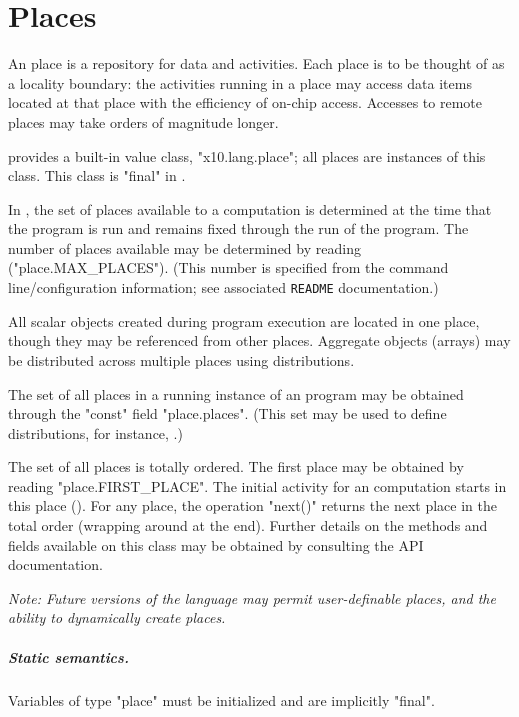 \chapter{Places}\label{XtenPlaces}

An \Xten{} place is a repository for data and activities. Each place
is to be thought of as a locality boundary: the activities running in
a place may access data items located at that place with the
efficiency of on-chip access. Accesses to remote places may take
orders of magnitude longer.

{}\Xten{} provides a built-in value class, \xcd"x10.lang.place"; all
places are instances of this class.  This class is \xcd"final" in
{}\XtenCurrVer.

In \XtenCurrVer{}, the set of places available to a computation is
determined at the time that the program is run and remains fixed
through the run of the program. The number of places available 
may be determined by reading (\xcd"place.MAX_PLACES"). (This number
is specified from the command line/configuration information; 
see associated {\tt README} documentation.)

All scalar objects created during program execution are located in one
place, though they may be referenced from other places. Aggregate
objects (arrays) may be distributed across multiple places using
distributions.

The set of all places in a running instance of an \Xten{} program may
be obtained through the \xcd"const" field \xcd"place.places".  (This
set may be used to define distributions, for instance,
.) 


The set of all places is totally ordered.  The first place may be
obtained by reading \xcd"place.FIRST_PLACE". The initial activity for
an \Xten{} computation starts in this place
(). For any place, the operation \xcd"next()"
returns the next place in the total order (wrapping around at the
end). Further details on the methods and fields available on this
class may be obtained by consulting the API documentation.

{\em Note: Future versions of the language may permit user-definable
places, and the ability to dynamically create places. }

\paragraph{Static semantics.}
Variables of type \xcd"place" must be initialized and are implicitly
\xcd"final".  

